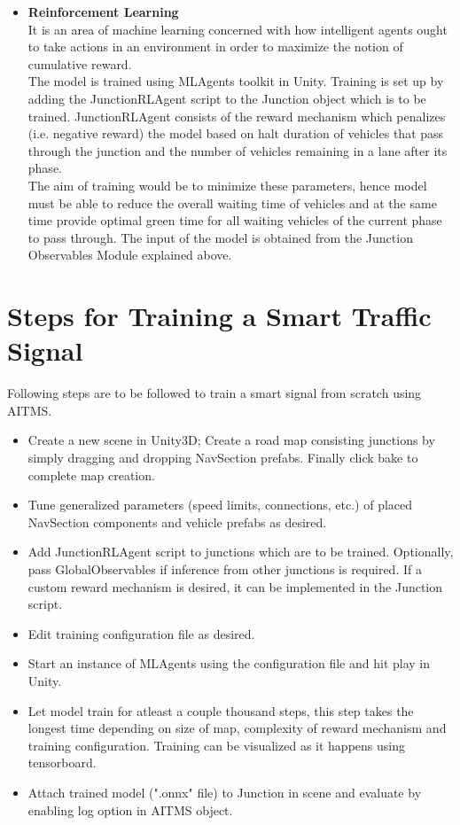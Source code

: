 \documentclass[openany,12pt]{report}
\begin{document}
\begin{itemize}
			
			
			\item{\textbf{Reinforcement Learning}}\\
			\hspace*{0.5in}It is an area of machine learning concerned with how intelligent agents ought to take actions in an environment in order to maximize the notion of cumulative reward.\\
			\hspace*{0.5in}The model is trained using MLAgents toolkit in Unity. Training is set up by adding the JunctionRLAgent script to the Junction object which is to be trained. JunctionRLAgent consists of the reward mechanism which penalizes (i.e. negative reward) the model based on halt duration of vehicles that pass through the junction and the number of vehicles remaining in a lane after its phase. \\
			\hspace*{0.5in}The aim of training would be to minimize these parameters, hence model must be able to reduce the overall waiting time of vehicles and at the same time provide optimal green time for all waiting vehicles of the current phase to pass through. The input of the model is obtained from the Junction Observables Module explained above.
			
		\end{itemize}
	
		\newpage
		\section{Steps for Training a Smart Traffic Signal}
		\hspace*{0.5 in}Following steps are to be followed to train a smart signal from scratch using AITMS.
		\begin{itemize}
			\item{Create a new scene in Unity3D; Create a road map consisting junctions by simply dragging and dropping NavSection prefabs. Finally click bake to complete map creation.}
			\item{Tune generalized parameters (speed limits, connections, etc.) of placed NavSection components and vehicle prefabs as desired.}
			\item{Add JunctionRLAgent script to junctions which are to be trained. Optionally, pass GlobalObservables if inference from other junctions is required. If a custom reward mechanism is desired, it can be implemented in the Junction script.}
			\item{Edit training configuration file as desired.}
			\item{Start an instance of MLAgents using the configuration file and hit play in Unity.}
			\item{Let model train for atleast a couple thousand steps, this step takes the longest time depending on size of map, complexity of reward mechanism and training configuration. Training can be visualized as it happens using tensorboard.}
			\item{Attach trained model (".onnx" file) to Junction in scene and evaluate by enabling log option in AITMS object.}
		\end{itemize}
	
\end{document}
